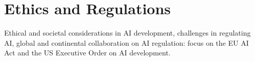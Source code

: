 \section{Ethics and Regulations}

Ethical and societal considerations in AI development, challenges in regulating AI, global and continental collaboration on AI regulation: focus on the EU AI Act and the US Executive Order on AI development.
